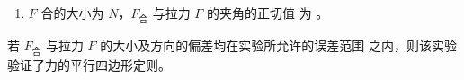 \begin{enumerate}
\begin{enumerate}
\begin{enumerate}
\banswer{
  
}


\item 
$ F $ 合的大小为
$ N $，$ F_{ \text{合} } $ 与拉力 $ F $ 的夹角的正切值
为  
。




\end{enumerate}

若 $ F_{ \text{合} } $ 与拉力 $ F $ 的大小及方向的偏差均在实验所允许的误差范围
之内，则该实验验证了力的平行四边形定则。



\end{enumerate}



\banswer{

}







\end{enumerate}

